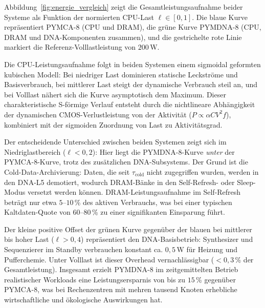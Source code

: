 ﻿\documentclass[a4paper,12pt]{article}
\theoremstyle{definition}
\begin{document}
Abbildung~\ref{fig:energie_vergleich} zeigt die Gesamtleistungsaufnahme beider Systeme als Funktion der normierten CPU-Last $\ell \in [0, 1]$. Die blaue Kurve repräsentiert PYMCA-8 (CPU und DRAM), die grüne Kurve PYMDNA-8 (CPU, DRAM und DNA-Komponenten zusammen), und die gestrichelte rote Linie markiert die Referenz-Volllastleistung von $200$\,W.

Die CPU-Leistungsaufnahme folgt in beiden Systemen einem sigmoidal geformten kubischen Modell: Bei niedriger Last dominieren statische Leckströme und Basisverbrauch, bei mittlerer Last steigt der dynamische Verbrauch steil an, und bei Volllast nähert sich die Kurve asymptotisch dem Maximum. Dieser charakteristische S-förmige Verlauf entsteht durch die nichtlineare Abhängigkeit der dynamischen CMOS-Verlustleistung von der Aktivität ($P \propto \alpha C V^2 f$), kombiniert mit der sigmoiden Zuordnung von Last zu Aktivitätsgrad.

Der entscheidende Unterschied zwischen beiden Systemen zeigt sich im Niedriglastbereich ($\ell < 0{,}2$): Hier liegt die PYMDNA-8-Kurve \emph{unter} der PYMCA-8-Kurve, trotz des zusätzlichen DNA-Subsystems. Der Grund ist die Cold-Data-Archivierung: Daten, die seit $\tau_{\mathrm{cold}}$ nicht zugegriffen wurden, werden in den DNA-L5 demotiert, wodurch DRAM-Bänke in den Self-Refresh- oder Sleep-Modus versetzt werden können. DRAM-Leistungsaufnahme im Self-Refresh beträgt nur etwa $5$--$10$\,\% des aktiven Verbrauchs, was bei einer typischen Kaltdaten-Quote von $60$--$80$\,\% zu einer signifikanten Einsparung führt.

Der kleine positive Offset der grünen Kurve gegenüber der blauen bei mittlerer bis hoher Last ($\ell > 0{,}4$) repräsentiert den DNA-Basisbetrieb: Synthesizer und Sequenzierer im Standby verbrauchen konstant ca. $0{,}5$\,W für Heizung und Pufferchemie. Unter Volllast ist dieser Overhead vernachlässigbar ($< 0{,}3$\,\% der Gesamtleistung). Insgesamt erzielt PYMDNA-8 im zeitgemittelten Betrieb realistischer Workloads eine Leistungsersparnis von bis zu $15$\,\% gegenüber PYMCA-8, was bei Rechenzentren mit mehren tausend Knoten erhebliche wirtschaftliche und ökologische Auswirkungen hat.
\end{document}
